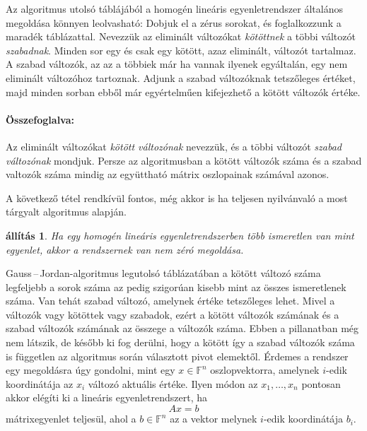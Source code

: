 \documentclass[a4paper, showtrims]{memoir}
\makeatletter
\renewenvironment{proof}[1][\proofname]
    {\par\pushQED{\qed}%
    \normalfont \topsep6\p@\@plus6\p@\relax
    \trivlist
    \item[\hskip\labelsep
        \itshape
    #1\@addpunct{:}]\ignorespaces}
    {\popQED\endtrivlist\@endpefalse}
\theoremstyle{plain}
\newtheorem{proposition}{állítás}[chapter]
\theoremstyle{remark}
\theoremstyle{definition}
\makeatother
\begin{document}
Az algoritmus utolsó táblájából a homogén lineáris egyenletrendszer általános megoldása könnyen leolvasható:
Dobjuk el a zérus sorokat, és foglalkozzunk a maradék táblázattal.
Nevezzük az eliminált változókat \emph{kötöttnek}
a többi változót \emph{szabadnak}.
Minden sor egy és csak egy kötött, azaz eliminált, változót tartalmaz.
A szabad változók, az az a többiek már ha vannak ilyenek egyáltalán, egy nem eliminált változóhoz tartoznak.
Adjunk a szabad változóknak tetszőleges értéket,
majd minden sorban ebből már egyértelműen kifejezhető a kötött változók értéke.

\paragraph{Összefoglalva:}\hspace{-1.em}
Az eliminált változókat
\emph{kötött változónak}
nevezzük,
és a többi változót
\emph{szabad változónak}
mondjuk. 
Persze az algoritmusban a kötött változók száma és a szabad valtozók száma mindig az együttható mátrix oszlopainak számával azonos.

A következő tétel rendkívül fontos, még akkor is ha teljesen nyilvánvaló a most tárgyalt algoritmus alapján.
\begin{proposition}
	Ha egy homogén lineáris egyenletrendszerben több ismeretlen van mint egyenlet,
	akkor a rendszernek van nem zéró megoldása.
\end{proposition}
\begin{proof}
	Gauss\,--\,Jordan-algoritmus  legutolsó táblázatában
	a kötött változó száma legfeljebb a sorok száma az pedig szigorúan kisebb mint az összes ismeretlenek száma.
	Van tehát szabad változó, amelynek értéke tetszőleges lehet.
\end{proof}
Mivel a változók vagy kötöttek vagy szabadok,
ezért a kötött változók számának és a szabad változók számának az összege a változók száma.
Ebben a pillanatban még nem látszik,
de később ki fog derülni,
hogy a kötött így a szabad változók száma is független az algoritmus során választott pivot elemektől.
Érdemes a rendszer egy megoldásra úgy gondolni, mint egy $x\in\mathbb{F}^n$ oszlopvektorra,
amelynek $i$-edik koordinátája az $x_i$ változó aktuális értéke.
Ilyen módon az $x_1,\ldots,x_n$ pontosan akkor elégíti ki a lineáris egyenletrendszert,
ha
\[
	Ax=b
\]
mátrixegyenlet teljesül, ahol a $b\in\mathbb{F}^n$ az a vektor melynek $i$-edik koordinátája $b_i$.
\end{document}
